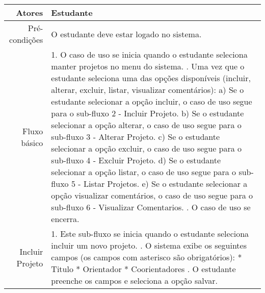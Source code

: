 \begin{longtable}{r p{12cm}}
\hline
Atores & Estudante \\ \hline
Pré-condições & O estudante deve estar logado no sistema.\\ \hline
Fluxo básico &  1. O caso de uso se inicia quando o estudante seleciona manter projetos no menu do sistema. \newline
                2. Uma vez que o estudante seleciona uma das opções disponíveis (incluir, alterar, excluir, listar, visualizar comentários): \newline
                \hspace*{1cm} a) Se o estudante selecionar a opção incluir, o caso de uso segue para o sub-fluxo 2 - Incluir Projeto. \newline 
                \hspace*{1cm} b) Se o estudante selecionar a opção alterar, o caso de uso segue para o sub-fluxo 3 - Alterar Projeto.  \newline 
                \hspace*{1cm} c) Se o estudante selecionar a opção excluir, o caso de uso segue para o sub-fluxo 4 - Excluir Projeto.  \newline 
                \hspace*{1cm} d) Se o estudante selecionar a opção listar, o caso de uso segue para o sub-fluxo 5 - Listar Projetos.  \newline 
                \hspace*{1cm} e) Se o estudante selecionar a opção visualizar comentários, o caso de uso segue para o sub-fluxo 6 - Visualizar Comentarios.  \newline 
                3. O caso de uso se encerra. \newline \\
Incluir Projeto & 1. Este sub-fluxo se inicia quando o estudante seleciona incluir um novo projeto. \newline
                    2. O sistema exibe os seguintes campos (os campos com asterisco são obrigatórios): \newline
                    \hspace*{1cm} * Titulo \newline
                    \hspace*{1cm} * Orientador \newline
                    \hspace*{1cm} * Coorientadores \newline
                    3. O estudante preenche os campos e seleciona a opção salvar. \newline

\end{longtable}
